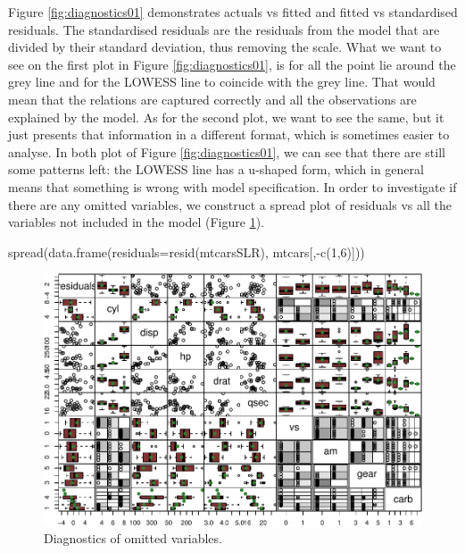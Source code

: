 \documentclass[
]{book}
\newenvironment{Shaded}{\begin{snugshade}}{\end{snugshade}}
\newcommand{\AttributeTok}[1]{\textcolor[rgb]{0.77,0.63,0.00}{#1}}
\newcommand{\DecValTok}[1]{\textcolor[rgb]{0.00,0.00,0.81}{#1}}
\newcommand{\FunctionTok}[1]{\textcolor[rgb]{0.00,0.00,0.00}{#1}}
\newcommand{\NormalTok}[1]{#1}
\newcommand{\SpecialCharTok}[1]{\textcolor[rgb]{0.00,0.00,0.00}{#1}}
\theoremstyle{definition}
\theoremstyle{definition}
\theoremstyle{definition}
\theoremstyle{definition}
\theoremstyle{remark}
\begin{document}
Figure \ref{fig:diagnostics01} demonstrates actuals vs fitted and fitted vs standardised residuals. The standardised residuals are the residuals from the model that are divided by their standard deviation, thus removing the scale. What we want to see on the first plot in Figure \ref{fig:diagnostics01}, is for all the point lie around the grey line and for the LOWESS line to coincide with the grey line. That would mean that the relations are captured correctly and all the observations are explained by the model. As for the second plot, we want to see the same, but it just presents that information in a different format, which is sometimes easier to analyse. In both plot of Figure \ref{fig:diagnostics01}, we can see that there are still some patterns left: the LOWESS line has a u-shaped form, which in general means that something is wrong with model specification. In order to investigate if there are any omitted variables, we construct a spread plot of residuals vs all the variables not included in the model (Figure \ref{fig:diagnostics02}).

\begin{Shaded}
\begin{Highlighting}[]
\FunctionTok{spread}\NormalTok{(}\FunctionTok{data.frame}\NormalTok{(}\AttributeTok{residuals=}\FunctionTok{resid}\NormalTok{(mtcarsSLR), mtcars[,}\SpecialCharTok{{-}}\FunctionTok{c}\NormalTok{(}\DecValTok{1}\NormalTok{,}\DecValTok{6}\NormalTok{)]))}
\end{Highlighting}
\end{Shaded}

\begin{figure}
\centering
\includegraphics{Svetunkov---Statistics-for-Business-Analytics_files/figure-latex/diagnostics02-1.pdf}
\caption{\label{fig:diagnostics02}Diagnostics of omitted variables.}
\end{figure}
\end{document}
